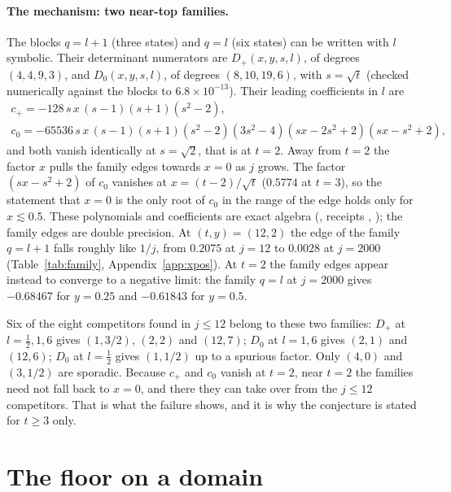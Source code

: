 \documentclass[11pt]{article}
\theoremstyle{definition}
\theoremstyle{remark}
\begin{document}
\paragraph{The mechanism: two near-top families.} The blocks $q=l+1$ (three states) and $q=l$ (six states) can be
written with $l$ symbolic. Their determinant numerators are $D_+(x,y,s,l)$, of degrees $(4,4,9,3)$, and $D_0(x,y,s,l)$, of
degrees $(8,10,19,6)$, with $s=\sqrt t$ (checked numerically against the blocks to $6.8\times10^{-13}$). Their leading
coefficients in $l$ are
\begin{gather*}
  c_+=-128\,s\,x\,(s-1)(s+1)(s^2-2),\\
  c_0=-65536\,s\,x\,(s-1)(s+1)(s^2-2)(3s^2-4)(sx-2s^2+2)(sx-s^2+2),
\end{gather*}
and both vanish identically at $s=\sqrt2$, that is at $t=2$. Away from $t=2$ the factor $x$ pulls the family edges
towards $x=0$ as $j$ grows. The factor $(sx-s^2+2)$ of $c_0$ vanishes at $x=(t-2)/\sqrt t$ ($0.5774$ at $t=3$), so the
statement that $x=0$ is the only root of $c_0$ in the range of the edge holds only for $x\lesssim0.5$. These polynomials
and coefficients are exact algebra (, receipts ,
); the family edges are double precision. At $(t,y)=(12,2)$ the edge of the family $q=l+1$
falls roughly like $1/j$, from $0.2075$ at $j=12$ to $0.0028$ at $j=2000$ (Table~\ref{tab:family},
Appendix~\ref{app:xpos}). At $t=2$ the family edges appear instead to converge to a negative limit: the family $q=l$ at
$j=2000$ gives $-0.68467$ for $y=0.25$ and $-0.61843$ for $y=0.5$.

Six of the eight competitors found in $j\le12$ belong to these two families: $D_+$ at $l=\tfrac12,1,6$ gives
$(1,3/2)$, $(2,2)$ and $(12,7)$; $D_0$ at $l=1,6$ gives $(2,1)$ and $(12,6)$; $D_0$ at $l=\tfrac12$ gives $(1,1/2)$ up to a
spurious factor. Only $(4,0)$ and $(3,1/2)$ are sporadic. Because $c_+$ and $c_0$ vanish at $t=2$, near $t=2$ the
families need not fall back to $x=0$, and there they can take over from the $j\le12$ competitors. That is what the
failure shows, and it is why the conjecture is stated for $t\ge3$ only.

\section{The floor on a domain}\label{sec:domain}
\end{document}
